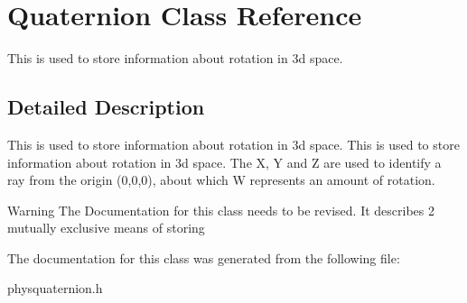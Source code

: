 \hypertarget{classQuaternion}{
\section{Quaternion Class Reference}
\label{d1/df1/classQuaternion}
}


This is used to store information about rotation in 3d space.  




\subsection{Detailed Description}
This is used to store information about rotation in 3d space. This is used to store information about rotation in 3d space. The X, Y and Z are used to identify a ray from the origin (0,0,0), about which W represents an amount of rotation. \begin{DoxyWarning}{Warning}
The Documentation for this class needs to be revised. It describes 2 mutually exclusive means of storing 
\end{DoxyWarning}


The documentation for this class was generated from the following file:\begin{DoxyCompactItemize}
\item 
physquaternion.h\end{DoxyCompactItemize}
